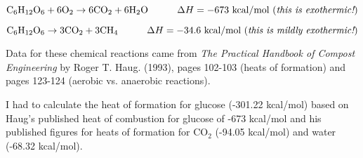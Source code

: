
$$\hbox{C}_6\hbox{H}_{12}\hbox{O}_6 + 6\hbox{O}_2 \to 6\hbox{CO}_2 + 6\hbox{H}_2\hbox{O} \hskip 30pt \Delta H = -673 \hbox{ kcal/mol ({\it this is exothermic!})}$$

\vskip 10pt

$$\hbox{C}_6\hbox{H}_{12}\hbox{O}_6 \to 3\hbox{CO}_2 + 3\hbox{CH}_4 \hskip 30pt \Delta H = -34.6 \hbox{ kcal/mol ({\it this is mildly exothermic!})}$$








Data for these chemical reactions came from {\it The Practical Handbook of Compost Engineering} by Roger T. Haug. (1993), pages 102-103 (heats of formation) and pages 123-124 (aerobic vs. anaerobic reactions).  

\vskip 10pt

I had to calculate the heat of formation for glucose (-301.22 kcal/mol) based on Haug's published heat of combustion for glucose of -673 kcal/mol and his published figures for heats of formation for CO$_{2}$ (-94.05 kcal/mol) and water (-68.32 kcal/mol).




